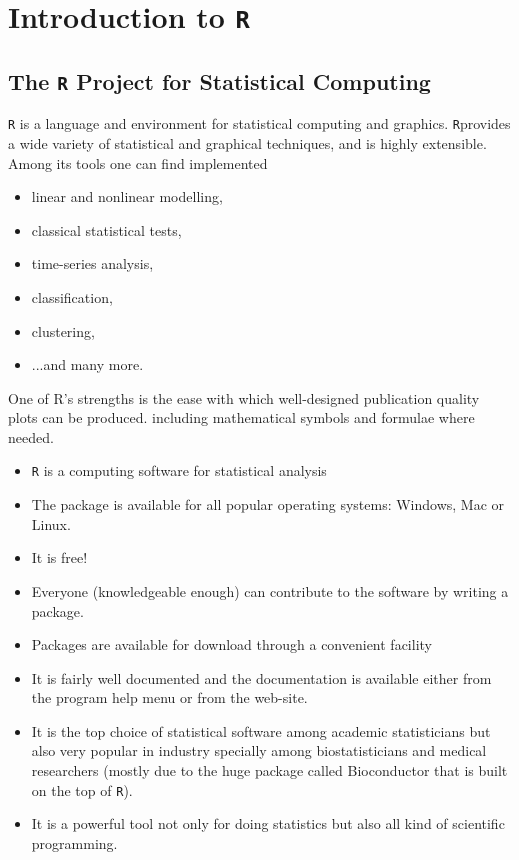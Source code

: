 \chapter{Introduction to \texttt{R}}

\section{The \texttt{R} Project for Statistical Computing}

\texttt{R} is a language and environment for statistical computing and graphics. \texttt{R}provides a wide variety of statistical and graphical techniques, and is highly extensible. Among its tools
one can find implemented
\begin{itemize}
	\item linear and nonlinear modelling,
	\item classical statistical tests,
	\item time-series analysis,
	\item classification,
	\item clustering,
	\item ...and many more.
\end{itemize}
One of R's strengths is the ease with which well-designed publication quality plots can be produced.
including mathematical symbols and formulae where needed.
\begin{itemize} \item
	\texttt{R} is a computing software for statistical analysis \item The package is available for all popular operating systems: Windows, Mac or Linux.
	\item It is free!
	\item Everyone (knowledgeable enough) can contribute to the software by
	writing a package.
	\item Packages are available for download through a convenient facility
	\item It is fairly well documented and the documentation is available either
	from the program help menu or from the web-site.
	\item It is the top choice of statistical software among academic statisticians
	but also very popular in industry specially among biostatisticians and
	medical researchers (mostly due to the huge package called
	Bioconductor that is built on the top of \texttt{R}).
	\item It is a powerful tool not only for doing statistics but also all kind of
	scientific programming.
\end{itemize}


